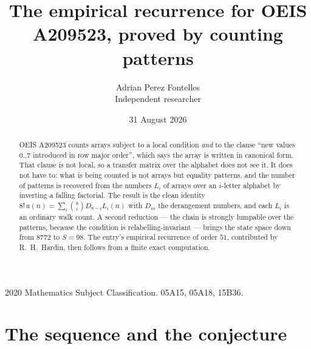 \documentclass[11pt,a4paper]{article}
\title{The empirical recurrence for OEIS A209523, proved by counting patterns}
\author{Adrian Perez Fontelles\\ \small Independent researcher}
\date{31 August 2026}
\theoremstyle{plain}
\theoremstyle{definition}
\begin{document}
\maketitle

\begin{abstract}
OEIS A209523 counts arrays subject to a local condition \emph{and} to the clause ``new values
$0..7$ introduced in row major order'', which says the array is written in canonical
form. That clause is not local, so a transfer matrix over the alphabet does not see it. It
does not have to: what is being counted is not arrays but equality patterns, and the number
of patterns is recovered from the numbers $L_i$ of arrays over an $i$-letter alphabet by
inverting a falling factorial. The result is the clean identity
$8!\,a(n)=\sum_i\binom{8}{i}D_{8-i}L_i(n)$ with $D_m$ the derangement numbers,
and each $L_i$ is an ordinary walk count. A second reduction --- the chain is strongly
lumpable over the patterns, because the condition is relabelling-invariant --- brings the
state space down from $8772$ to $S=98$. The entry's empirical recurrence of order
$51$, contributed by R.~H.~Hardin, then follows from a finite exact computation.
\end{abstract}

\noindent\small 2020 Mathematics Subject Classification. 05A15, 05A18, 15B36.\normalsize

\section{The sequence and the conjecture}
\end{document}
